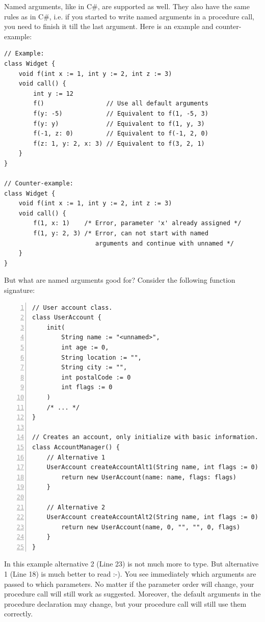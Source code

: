 \documentclass[a5paper]{report}
\def\csharp{\textsc{C\#}\xspace}
\begin{document}
Named arguments, like in \csharp, are supported as well. They also have the same rules as in \csharp,
i.e. if you started to write named arguments in a procedure call, you need to finish it till the last argument.
Here is an example and counter-example:
\begin{lstlisting}
// Example:
class Widget {
    void f(int x := 1, int y := 2, int z := 3)
    void call() {
        int y := 12
        f()                 // Use all default arguments
        f(y: -5)            // Equivalent to f(1, -5, 3)
        f(y: y)             // Equivalent to f(1, y, 3)
        f(-1, z: 0)         // Equivalent to f(-1, 2, 0)
        f(z: 1, y: 2, x: 3) // Equivalent to f(3, 2, 1)
    }
}

// Counter-example:
class Widget {
    void f(int x := 1, int y := 2, int z := 3)
    void call() {
        f(1, x: 1)    /* Error, parameter 'x' already assigned */
        f(1, y: 2, 3) /* Error, can not start with named
                         arguments and continue with unnamed */
    }
}
\end{lstlisting}
But what are named arguments good for? Consider the following function signature:
\begin{lstlisting}[numbers=left]
// User account class.
class UserAccount {
    init(
        String name := "<unnamed>",
        int age := 0,
        String location := "",
        String city := "",
        int postalCode := 0
        int flags := 0
    )
    /* ... */
}

// Creates an account, only initialize with basic information.
class AccountManager() {
    // Alternative 1
    UserAccount createAccountAlt1(String name, int flags := 0) {
        return new UserAccount(name: name, flags: flags)
    }
    
    // Alternative 2
    UserAccount createAccountAlt2(String name, int flags := 0) {
        return new UserAccount(name, 0, "", "", 0, flags)
    }
}
\end{lstlisting}
In this example alternative 2 (Line 23) is not much more to type. But alternative 1 (Line 18) is much better to read :-).
You see immediately which arguments are passed to which parameters. No matter if the parameter order will change,
your procedure call will still work as suggested. Moreover, the default arguments in the procedure declaration
may change, but your procedure call will still use them correctly.


\end{document}
